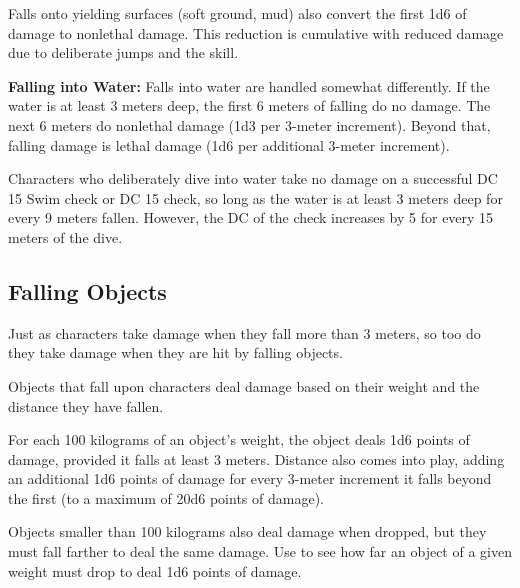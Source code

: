 Falls onto yielding surfaces (soft ground, mud) also convert the first 1d6 of damage to nonlethal damage. This reduction is cumulative with reduced damage due to deliberate jumps and the  skill.

\textbf{Falling into Water:} Falls into water are handled somewhat differently. If the water is at least 3 meters deep, the first 6 meters of falling do no damage. The next 6 meters do nonlethal damage (1d3 per 3-meter increment). Beyond that, falling damage is lethal damage (1d6 per additional 3-meter increment).

Characters who deliberately dive into water take no damage on a successful DC 15 Swim check or DC 15  check, so long as the water is at least 3 meters deep for every 9 meters fallen. However, the DC of the check increases by 5 for every 15 meters of the dive.


\subsection{Falling Objects}
Just as characters take damage when they fall more than 3 meters, so too do they take damage when they are hit by falling objects.

Objects that fall upon characters deal damage based on their weight and the distance they have fallen.

For each 100 kilograms of an object's weight, the object deals 1d6 points of damage, provided it falls at least 3 meters. Distance also comes into play, adding an additional 1d6 points of damage for every 3-meter increment it falls beyond the first (to a maximum of 20d6 points of damage).

Objects smaller than 100 kilograms also deal damage when dropped, but they must fall farther to deal the same damage. Use  to see how far an object of a given weight must drop to deal 1d6 points of damage.


